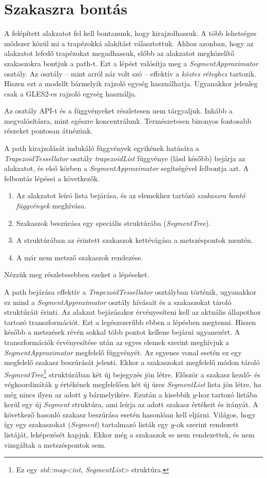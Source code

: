 \documentclass[12pt]{report}
\theoremstyle{definition}
\newcommand{\func}[1]{{\textsl{#1}}}
\begin{document}
  \section{Szakaszra bontás}

A felépített alakzatot fel kell bontanunk, hogy kirajzolhassuk. A több
lehetséges módszer közül mi a trapézokká alakítást választottuk. Ahhoz azonban,
hogy az alakzatot lefedő trapézokat megadhassuk, előbb az alakzatot megközelítő
szakaszokra bontjuk a path-t. Ezt a lépést valósítja meg a
\func{SegmentApproximator} osztály. Az osztály -- mint arról nár volt szó --
effektív a \emph{köztes réteghez} tartozik. Hiszen ezt a modellt bármelyik
rajzoló egység használhatja. Ugyanakkor jelenleg csak a GLES2-es rajzoló egység
használja.

Az osztály API-t és a függvényeket részletesen nem tárgyaljuk. Inkább a
megvalósításra, mint egészre koncentrálunk. Természetesen bizonyos fontosabb
részeket pontosan átnézünk.

A path kirajzolását indukáló függvények egyikének hatására a
\func{TrapezoidTessellator} osztály \func{trapezoidList} függvénye (lásd
később) bejárja az alakzatot, és első körben a \func{SegmentApproximator}
segítségével felbontja azt. A felbontás lépései a következők.
  \begin{enumerate}
    \item Az alakzatot leíró lista bejárása, és az elemekhez tartózó
    \emph{szakaszra bontó függvények} meghívása.
    \item Szakaszok beszúrása egy speciális struktúrába (\func{SegmentTree}).
    \item A struktúrában az érintett szakaszok kettévágása a metszéspontok
    mentén.
    \item A már nem metsző szakaszok rendezése.
  \end{enumerate}
Nézzük meg részletesebben ezeket a lépéseket.

A path bejárása effektív a \func{TrapezoidTessellator} osztályban történik,
ugyanakkor ez mind a \func{SegmentApproximator} osztály hívásait és a
szakaszokat tároló struktúráit érinti. Az alakzat bejárásakor érvényesíteni
kell az aktuális állapothoz tartozó transzformációt. Ezt a legészszerűbb ebben
a lépésben megtenni. Hiszen később a metszések révén sokkal több pontot kellene
bejárni ugyanezért. A transzformációk érvényesítése után az egyes elemek
szerint meghívjuk a \func{SegmentApproximator} megfelelő függvényét. Az egyenes
vonal esetén ez egy megfelelő szakasz beszúrását jelenti. Ekkor a szakaszokat
megfelelő módon tároló \func{SegmentTree}\footnote{Ez egy \func{std::map<int,
SegmentList>} struktúra.} struktúrában két új bejegyzés jön létre. Először a
szakasz kezdő- és végkoordináták $y$ értékének megfelelően két új üres
\func{SegmentList} lista jön létre, ha még nincs ilyen az adott $y$
bármelyikére. Ezután a kisebbik $y$-hoz tartozó listába kerül egy új
\func{Segment} struktúra, ami leírja az adott szakasz értékeit és irányát. A
következő hasonló szakasz beszúrása esetén hasonlóan kell eljárni. Világos,
hogy így egy szakaszokat (\func{Segment}) tartalmazó listák egy $y$-ok szerint
rendezett listáját, leképezését kapjuk. Ekkor még a szakaszok se nem
rendezettek, és nem vizsgáltak a metszéspontok sem.
\end{document}
